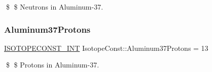\$ \$ Neutrons in Aluminum-\/37. \mbox{\label{group___isotope_const-_aluminum-_al37_gac152948bcdcde1c58f68c814e4ec6142}} 
\subsubsection{\texorpdfstring{Aluminum37\+Protons}{Aluminum37Protons}}
{\footnotesize\ttfamily \mbox{\hyperlink{group___isotope_const-_macros_ga5f18360b3e99483a35c32d789e62621c}{I\+S\+O\+T\+O\+P\+E\+C\+O\+N\+S\+T\+\_\+\+I\+NT}} Isotope\+Const\+::\+Aluminum37\+Protons = 13}

\$ \$ Protons in Aluminum-\/37. 